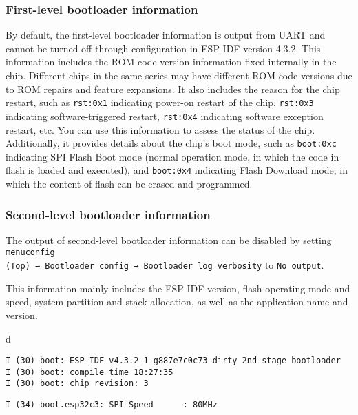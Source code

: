 \documentclass[a4paper,12pt]{book}
\begin{document}
\subsubsection{First-level bootloader information}
By default, the first-level bootloader information is output from UART and cannot be turned off through configuration in ESP-IDF version 4.3.2. This information includes the ROM code version information fixed internally in the chip. Different chips in the same series may have different ROM code versions due to ROM repairs and feature expansions. It also includes the reason for the chip restart, such as \verb|rst:0x1| indicating power-on restart of the chip, \verb|rst:0x3| indicating software-triggered restart, \verb|rst:0x4| indicating software exception restart, etc. You can use this information to assess the status of the chip. Additionally, it provides details about the chip’s boot mode, such as \verb|boot:0xc| indicating SPI Flash Boot mode (normal operation mode, in which the code in flash is loaded and executed), and \verb|boot:0x4| indicating Flash Download mode, in which the content of flash can be erased and programmed.

\subsubsection{Second-level bootloader information}
The output of second-level bootloader information can be disabled by setting \verb|menuconfig|\\ \verb|(Top) → Bootloader config → Bootloader log verbosity| to \verb|No output|.

This information mainly includes the ESP-IDF version, flash operating mode and speed, system partition and stack allocation, as well as the application name and version.

\begin{codebloc}
\begin{tabular}{d}
\vspace{2pt}
\begin{verbatim}
I (30) boot: ESP-IDF v4.3.2-1-g887e7c0c73-dirty 2nd stage bootloader
I (30) boot: compile time 18:27:35
I (30) boot: chip revision: 3
\end{verbatim}
\verb|I (34) boot.esp32c3: SPI Speed      : 80MHz|
\end{tabular}
\end{codebloc}
\end{document}
